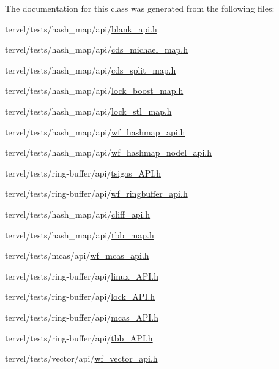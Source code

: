 The documentation for this class was generated from the following files\+:\begin{DoxyCompactItemize}
\item 
tervel/tests/hash\+\_\+map/api/\hyperlink{blank__api_8h}{blank\+\_\+api.\+h}\item 
tervel/tests/hash\+\_\+map/api/\hyperlink{cds__michael__map_8h}{cds\+\_\+michael\+\_\+map.\+h}\item 
tervel/tests/hash\+\_\+map/api/\hyperlink{cds__split__map_8h}{cds\+\_\+split\+\_\+map.\+h}\item 
tervel/tests/hash\+\_\+map/api/\hyperlink{lock__boost__map_8h}{lock\+\_\+boost\+\_\+map.\+h}\item 
tervel/tests/hash\+\_\+map/api/\hyperlink{lock__stl__map_8h}{lock\+\_\+stl\+\_\+map.\+h}\item 
tervel/tests/hash\+\_\+map/api/\hyperlink{wf__hashmap__api_8h}{wf\+\_\+hashmap\+\_\+api.\+h}\item 
tervel/tests/hash\+\_\+map/api/\hyperlink{wf__hashmap__nodel__api_8h}{wf\+\_\+hashmap\+\_\+nodel\+\_\+api.\+h}\item 
tervel/tests/ring-\/buffer/api/\hyperlink{tsigas___a_p_i_8h}{tsigas\+\_\+\+A\+P\+I.\+h}\item 
tervel/tests/ring-\/buffer/api/\hyperlink{wf__ringbuffer__api_8h}{wf\+\_\+ringbuffer\+\_\+api.\+h}\item 
tervel/tests/hash\+\_\+map/api/\hyperlink{cliff__api_8h}{cliff\+\_\+api.\+h}\item 
tervel/tests/hash\+\_\+map/api/\hyperlink{tbb__map_8h}{tbb\+\_\+map.\+h}\item 
tervel/tests/mcas/api/\hyperlink{wf__mcas__api_8h}{wf\+\_\+mcas\+\_\+api.\+h}\item 
tervel/tests/ring-\/buffer/api/\hyperlink{linux___a_p_i_8h}{linux\+\_\+\+A\+P\+I.\+h}\item 
tervel/tests/ring-\/buffer/api/\hyperlink{lock___a_p_i_8h}{lock\+\_\+\+A\+P\+I.\+h}\item 
tervel/tests/ring-\/buffer/api/\hyperlink{mcas___a_p_i_8h}{mcas\+\_\+\+A\+P\+I.\+h}\item 
tervel/tests/ring-\/buffer/api/\hyperlink{tbb___a_p_i_8h}{tbb\+\_\+\+A\+P\+I.\+h}\item 
tervel/tests/vector/api/\hyperlink{wf__vector__api_8h}{wf\+\_\+vector\+\_\+api.\+h}\end{DoxyCompactItemize}
